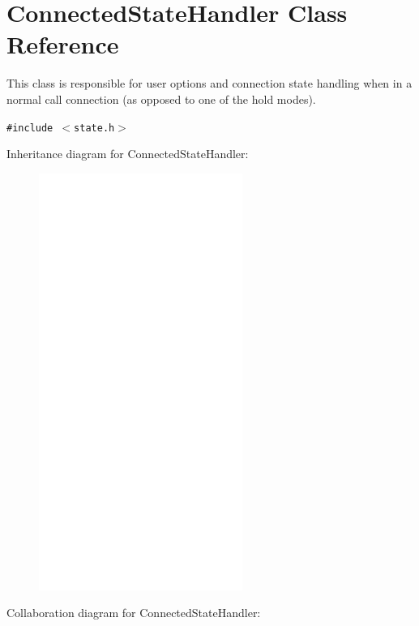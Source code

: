 \hypertarget{classConnectedStateHandler}{
\section{ConnectedStateHandler Class Reference}
\label{classConnectedStateHandler}
}
This class is responsible for user options and connection state handling when in a normal call connection (as opposed to one of the hold modes).  


{\tt \#include $<$state.h$>$}

Inheritance diagram for ConnectedStateHandler:\nopagebreak
\begin{figure}[H]
\begin{center}
\leavevmode
\includegraphics[width=188pt]{classConnectedStateHandler__inherit__graph}
\end{center}
\end{figure}
Collaboration diagram for ConnectedStateHandler:\nopagebreak
